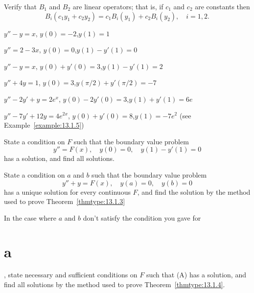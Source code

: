 \begin{exerciselist}
  \item\label{exer:13.1.1} Verify that $B_{1}$ and $B_{2}$ are linear operators; that is, if $c_{1}$
        and $c_{2}$ are constants then
  \[
    B_{i}(c_{1}y_{1}+c_{2}y_{2})=c_{1}B_{i}(y_{1})+c_{2}B_{i}(y_{2}),\quad i=1,2.
  \]


  \item\label{exer:13.1.2} $y''-y=x$, \quad $y(0)=-2$,\quad $y(1)=1$

  \item\label{exer:13.1.3} $y''=2-3x$, \quad $y(0)=0$,\quad $y(1)-y'(1)=0$

  \item\label{exer:13.1.4} $y''-y=x$, \quad $y(0)+y'(0)=3$,\quad $y(1)-y'(1)=2$

  \item\label{exer:13.1.5} $y''+4y=1$, \quad $y(0)=3$,\quad $y(\pi/2)+y'(\pi/2)=-7$

  \item\label{exer:13.1.6} $y''-2y'+y=2e^{x}$, \quad $y(0)-2y'(0)=3$,\quad $y(1)+y'(1)=6e$

  \item\label{exer:13.1.7} $y''-7y'+12y=4e^{2x}$, \quad $y(0)+y'(0)=8$,\quad $y(1)=-7e^{2}$ (see
        Example~\ref{example:13.1.5})

  \item\label{exer:13.1.8} State a condition on $F$ such that the boundary value problem
  \[
    y''=F(x),\quad y(0)=0,\quad y(1)-y'(1)=0
  \]
  has a solution, and find all solutions.

  \item\label{exer:13.1.9}
  \begin{alist}
    \item %
    State a condition on $a$ and $b$ such that the boundary value problem
    \begin{equation}
      y''+y=F(x),\quad y(a)=0,\quad y(b)=0\tag{A}
    \end{equation}
    has a unique solution for every continuous $F$, and find the solution by the method used to
    prove Theorem~\ref{thmtype:13.1.3}

    \item %
    In the case where $a$ and $b$ don't satisfy the condition you gave for \part{a}, state necessary
    and sufficient conditions on $F$ such that (A) has a solution, and find all solutions by the method used to
    prove Theorem~\ref{thmtype:13.1.4}.
  \end{alist}


\end{exerciselist}
